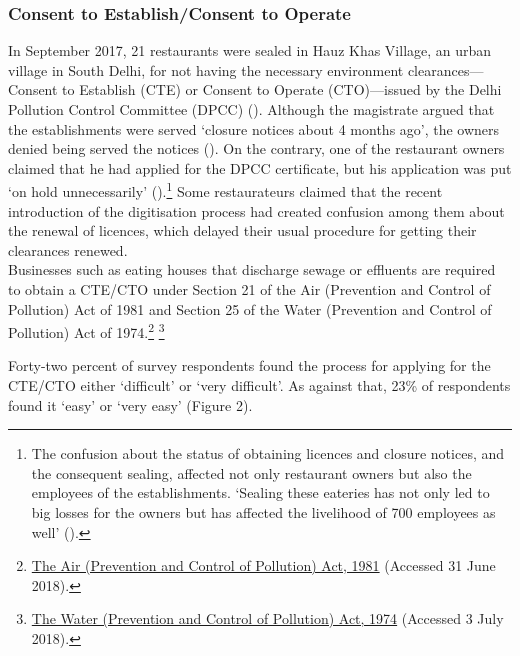 \documentclass[a4paper, 12pt]{article}
\begin{document}
                   \subsubsection{Consent to Establish/Consent to Operate}
                   In September 2017, 21 restaurants were sealed in Hauz Khas Village, an urban village in South Delhi, for not having the necessary environment clearances—Consent to Establish (CTE) or Consent to Operate (CTO)—issued by the Delhi Pollution 
Control Committee (DPCC) (\cite{ht2017delhkvsealing}). Although the magistrate argued that the establishments were served ‘closure notices about 4 months ago’, the owners denied being served the notices (\cite{ht2017delhkvsealing}). On the contrary, one of the restaurant owners 
claimed that he had applied for the DPCC certificate, but his application was put ‘on hold unnecessarily’ (\cite{ht2017delhkvsealing}).\footnote{The confusion about the status of obtaining licences and closure notices, and the consequent sealing, affected not only restaurant owners but 
also the employees of the establishments. ‘Sealing these eateries has not only led to big losses for the owners but has affected the livelihood of 700 employees as well’ (\cite{dnahkvsealingdrive}).} Some restaurateurs claimed that the recent introduction of the 
digitisation process had created confusion among them about the renewal of licences, which delayed their usual procedure for getting their clearances renewed.\\ %
                   
                   Businesses such as eating houses that discharge sewage or effluents are required to obtain a CTE/CTO under Section 21 of the Air (Prevention and Control of Pollution) Act of 1981 and Section 25 of the Water (Prevention and Control of Pollution) Act 
of 1974.\footnote{\href{https://bit.ly/2pbaWOw}{The Air (Prevention and Control of Pollution) Act, 1981} (Accessed 31 June 2018).} \footnote{\href{https://bit.ly/2xcUyRW}{The Water (Prevention and Control of Pollution) Act, 1974} (Accessed 3 July 2018).}  %
                   
                   Forty-two percent of survey respondents found the process for applying for the CTE/CTO either ‘difficult’ or ‘very difficult’. As against that, 23\% of respondents found it ‘easy’ or ‘very easy’ (Figure 2).
                          
\end{document}
